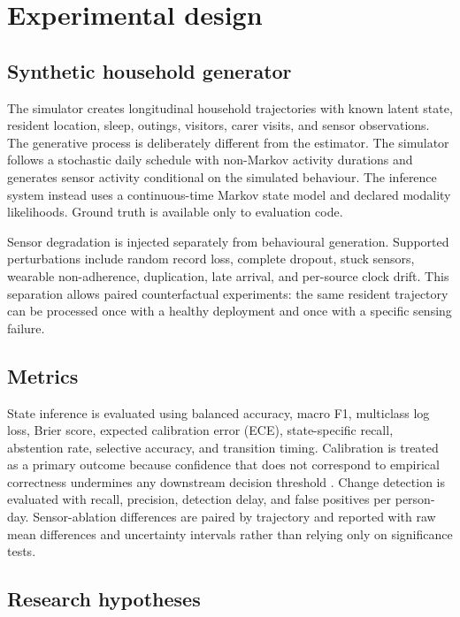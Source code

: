 \documentclass[11pt]{article}
\begin{document}
\section{Experimental design}
\label{sec:experiments}

\subsection{Synthetic household generator}

The simulator creates longitudinal household trajectories with known latent state, resident location, sleep, outings, visitors, carer visits, and sensor observations. The generative process is deliberately different from the estimator. The simulator follows a stochastic daily schedule with non-Markov activity durations and generates sensor activity conditional on the simulated behaviour. The inference system instead uses a continuous-time Markov state model and declared modality likelihoods. Ground truth is available only to evaluation code.

Sensor degradation is injected separately from behavioural generation. Supported perturbations include random record loss, complete dropout, stuck sensors, wearable non-adherence, duplication, late arrival, and per-source clock drift. This separation allows paired counterfactual experiments: the same resident trajectory can be processed once with a healthy deployment and once with a specific sensing failure.

\subsection{Metrics}

State inference is evaluated using balanced accuracy, macro F1, multiclass log loss, Brier score, expected calibration error (ECE), state-specific recall, abstention rate, selective accuracy, and transition timing. Calibration is treated as a primary outcome because confidence that does not correspond to empirical correctness undermines any downstream decision threshold \citep{guo2017calibration}. Change detection is evaluated with recall, precision, detection delay, and false positives per person-day. Sensor-ablation differences are paired by trajectory and reported with raw mean differences and uncertainty intervals rather than relying only on significance tests.

\subsection{Research hypotheses}
\end{document}
